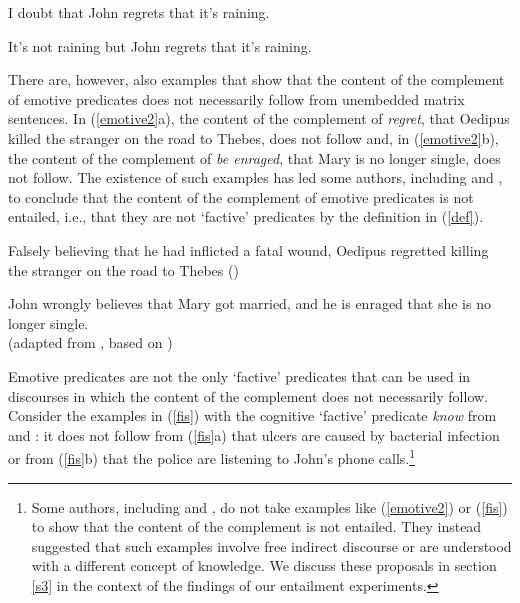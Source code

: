 \documentclass[11pt,fleqn]{article}
\def\infelic{{\leavevmode\llap{\#}}}
\newcommand{\6}{\mbox{$[\hspace*{-.6mm}[$}}
\newcommand{\9}{\mbox{$]\hspace*{-.6mm}]$}}
\begin{document}
\begin{exe}

\ex\label{emotive1} \citealt[514]{abrusan2011}

\begin{xlist}

\ex I doubt that John regrets that it's raining.

\ex \infelic It's not raining but John regrets that it's raining. 

\end{xlist}

\end{exe}

There are, however, also examples that show that the content of the complement of emotive predicates does not necessarily follow from unembedded matrix sentences. In (\ref{emotive2}a), the content of the complement of {\em regret}, that Oedipus killed the stranger on the road to Thebes, does not follow and, in (\ref{emotive2}b), the content of the complement of {\em be enraged}, that Mary is no longer single, does not follow. The existence of such examples has led some authors, including \citet{klein1975,giannakidou1998,schlenker2003} and \citet{egre2008}, to conclude that the content of the complement of emotive predicates is not entailed, i.e., that they are not `factive' predicates by the definition in (\ref{def}).

\begin{exe}

\ex\label{emotive2}

\begin{xlist}

\ex Falsely believing that he had inflicted a fatal wound, Oedipus regretted killing the stranger on the road to Thebes \hfill (\citealt{klein1975})

\ex John wrongly believes that Mary got married, and he is enraged that she is no longer single. \\ \hspace*{.2cm} \hfill (adapted from \citealt{egre2008}, based on \citealt{schlenker03})

\end{xlist}

\end{exe}
Emotive predicates are not the only `factive' predicates that can be used in discourses in which the content of the complement does not necessarily follow. Consider the examples in (\ref{fis}) with the cognitive `factive' predicate {\em know} from  \citealt{hazlett2010} and \citealt{abrusan2011}:  it does not follow from (\ref{fis}a) that ulcers are caused by bacterial infection or from (\ref{fis}b) that the police are listening to John's phone calls.\footnote{Some authors, including \citet{gazdar79a} and \citet{abrusan2011}, do not take examples like (\ref{emotive2}) or (\ref{fis}) to show that the content of the complement is not entailed. They instead suggested that such examples involve free indirect discourse or are understood with a different concept of knowledge. We discuss these proposals in section \ref{s3} in the context of the findings of our entailment experiments.}
\end{document}
